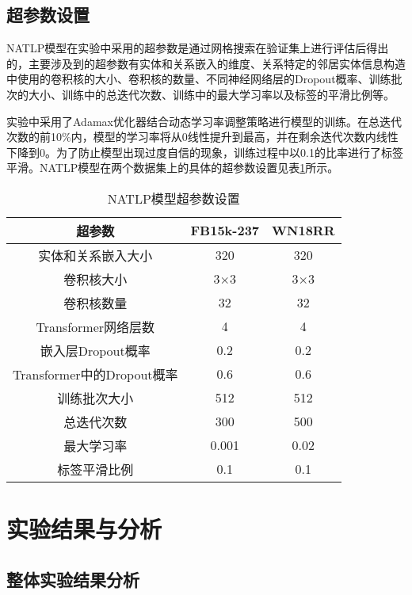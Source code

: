 \subsection{超参数设置}

NATLP模型在实验中采用的超参数是通过网格搜索在验证集上进行评估后得出的，主要涉及到的超参数有实体和关系嵌入的维度、关系特定的邻居实体信息构造中使用的卷积核的大小、卷积核的数量、不同神经网络层的Dropout概率、训练批次的大小、训练中的总迭代次数、训练中的最大学习率以及标签的平滑比例等。

实验中采用了Adamax优化器结合动态学习率调整策略进行模型的训练。在总迭代次数的前10\%内，模型的学习率将从0线性提升到最高，并在剩余迭代次数内线性下降到0。为了防止模型出现过度自信的现象，训练过程中以0.1的比率进行了标签平滑。NATLP模型在两个数据集上的具体的超参数设置见表\ref{NALTP_hyperparameter}所示。

\begin{table}[htbp]
  \renewcommand\arraystretch{1.5}
  \caption{NATLP模型超参数设置}
  \centering
  \begin{tabular}{*{3}{c}}
    \toprule
    超参数 & FB15k-237 & WN18RR\\
    \midrule
    实体和关系嵌入大小  & 320 & 320 \\
    卷积核大小 & 3$\times$3 & 3$\times$3\\
    卷积核数量 & 32 & 32\\
    Transformer网络层数& 4 & 4\\
    嵌入层Dropout概率 & 0.2 & 0.2\\
    Transformer中的Dropout概率 & 0.6 & 0.6\\
    训练批次大小 & 512 & 512\\
    总迭代次数& 300 & 500 \\
    最大学习率 & 0.001 & 0.02\\
    标签平滑比例 & 0.1 & 0.1\\
    \bottomrule
  \end{tabular}
  \label{NALTP_hyperparameter}
\end{table}

\section{实验结果与分析}

\subsection{整体实验结果分析}

